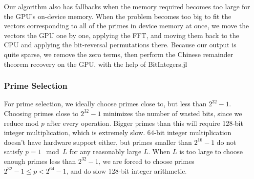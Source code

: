 Our algorithm also has fallbacks when the memory required becomes too large for the 
GPU's on-device memory.
When the problem becomes too big to fit the vectors corresponding to all of the primes
in device memory at once, we move the vectors
the GPU one by one, applying the FFT, and moving them back to the CPU and applying the bit-reversal permutations there.
Because our output is quite sparse, we remove the zero terms, then 
perform the Chinese remainder theorem recovery on the GPU, with the help of BitIntegers.jl


\subsubsection{Prime Selection}
For prime selection, we ideally choose primes close to, but less than $2^{32} - 1$.
Choosing primes close to $2^{32} - 1$ minimizes the number of wasted bits, since we reduce mod $p$ after every operation.
Bigger primes than this will require 128-bit integer multiplication, which is extremely slow.
64-bit integer multiplication doesn't have hardware support either, but primes smaller than $2^{16} - 1$ do not satisfy
$p = 1 \mod L$ for any reasonably large $L$. When $L$ is too large to choose enough primes less than $2^{32} - 1$, we are forced to
choose primes $2^{32} - 1 \le p < 2^{64} - 1$, and do slow 128-bit integer arithmetic.


